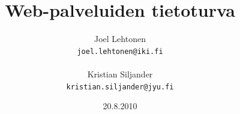 \documentclass[a4paper,12pt]{article}
\title{Web-palveluiden tietoturva}
\author{Joel Lehtonen\\ \texttt{joel.lehtonen@iki.fi} \\\\Kristian Siljander\\ \texttt{kristian.siljander@jyu.fi}}
\date{20.8.2010}
\begin{document}
\maketitle



\pagebreak



\end{document}
